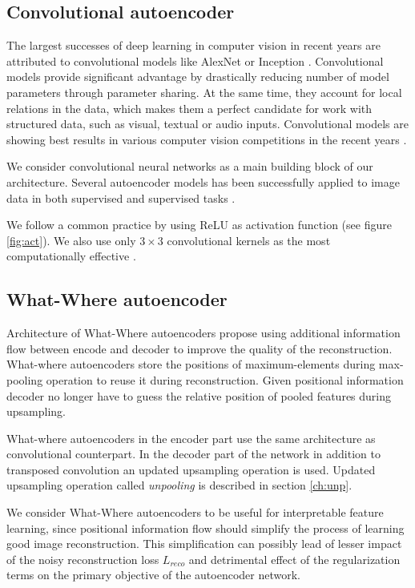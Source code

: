 \subsection{Convolutional autoencoder} \label{ss:cnnaec}

The largest successes of deep learning in computer vision in recent years are attributed to convolutional models like AlexNet or Inception \cite{Krizhevsky2012, Szegedy2016}.
Convolutional models provide significant advantage by drastically reducing number of model parameters through parameter sharing.
At the same time, they account for local relations in the data, which makes them a perfect candidate for work with structured data, such as visual, textual or audio inputs.
Convolutional models are showing best results in various computer vision competitions in the recent years \cite{ILSVRC15, Zhou2016}.

We consider convolutional neural networks as a main building block of our architecture.
Several autoencoder models has been successfully applied to image data in both supervised and supervised tasks \cite{Rifai2011, Vincent2010, Masci2011, Goodfellow2014, Kulkarni2015}.

We follow a common practice by using ReLU as activation function (see figure \ref{fig:act}).
We also use only $3 \times 3$ convolutional kernels as the most computationally effective \cite{Szegedy2016a}.

\subsection{What-Where autoencoder}

Architecture of What-Where autoencoders \cite{Zhao2015} propose using additional information flow between encode and decoder to improve the quality of the reconstruction.
What-where autoencoders store the positions of maximum-elements during max-pooling operation to reuse it during reconstruction.
Given positional information decoder no longer have to guess the relative position of pooled features during upsampling.

What-where autoencoders in the encoder part use the same architecture as convolutional counterpart.
In the decoder part of the network in addition to transposed convolution an updated upsampling operation is used.
Updated upsampling operation called \textit{unpooling} is described in section \ref{ch:unp}.

We consider What-Where autoencoders to be useful for interpretable feature learning, since positional information flow should simplify the process of learning good image reconstruction.
This simplification can possibly lead of lesser impact of the noisy reconstruction loss $L_{reco}$ and detrimental effect of the regularization terms on the primary objective of the autoencoder network.

